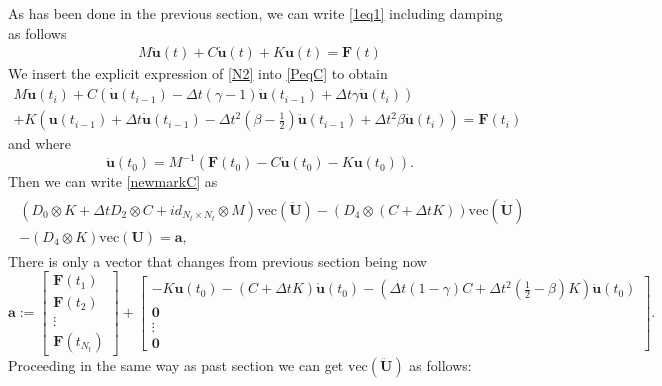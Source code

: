 \documentclass[a4paper, 10pt]{article}
\begin{document}
As has been done in the previous section, we can write \eqref{1eq1} including damping as follows
\begin{align}
M \ddot{\mathbf{u}}(t) + C \dot{\mathbf{u}}(t)  + K \mathbf{u}(t) = \mathbf{F}(t) \label{PeqC}
\end{align}
We insert the explicit expression of \eqref{N2} into \eqref{PeqC} to obtain
\begin{align}
 M \ddot{\mathbf{u}}(t_{i})  + C \left(\dot{\mathbf{u}}(t_{i-1})
- \Delta t \left( \gamma -1\right)\ddot{\mathbf{u}}(t_{i-1}) + \Delta t \gamma \ddot{\mathbf{u}}(t_{i}) \right) \\
+ K \left(\mathbf{u}(t_{i-1}) + \Delta t \dot{\mathbf{u}}(t_{i-1})
- \Delta t^2 \left( \beta -\frac{1}{2}\right)\ddot{\mathbf{u}}(t_{i-1}) + \Delta t^2 \beta \ddot{\mathbf{u}}(t_{i}) \right)   = \mathbf{F}(t_{i})\label{newmarkC}
\end{align}
and where
$$
\ddot{\mathbf{u}}(t_0) = M^{-1}\left( \mathbf{F}(t_0) - C \dot{\mathbf{u}}(t_0) - K \mathbf{u}(t_0) \right).
$$
Then we can write \ref{newmarkC} as
\begin{align}
\begin{array}{c}
\left(D_0 \otimes K + \Delta t D_2 \otimes C + id_{N_t \times N_t} \otimes  M  \right) \mathrm{vec}(\ddot{\mathbf{U}}) - \left(D_4 \otimes  \left(C+\Delta t K\right)\right)\mathrm{vec}(\dot{\mathbf{U}}) \\
- \left( D_4 \otimes   K\right)\mathrm{vec}(\mathbf{U}) =
\mathbf{a},
\end{array}\label{newmark1}
\end{align}
There is only a vector that changes from previous section being now
$$
\mathbf{a}:= \left[
\begin{array}{c}
\mathbf{F}(t_1)\\
\mathbf{F}(t_2) \\
\vdots \\
\mathbf{F}(t_{N_t}) 
\end{array}
\right] + 
\left[
\begin{array}{c}
-  K  \mathbf{u}(t_0) - \left( C + \Delta t K \right) \dot{\mathbf{u}}(t_0) - \left( \Delta t \left(1 - \gamma \right) C + \Delta t^2 \left( \frac{1}{2}-\beta \right) K \right)\ddot{\mathbf{u}}(t_0)\\
\mathbf{0} \\
\vdots \\
\mathbf{0} 
\end{array}
\right].
$$
Proceeding in the same way as past section we can get $\mathrm{vec}(\ddot{\mathbf{U}})$ as follows:
\end{document}
